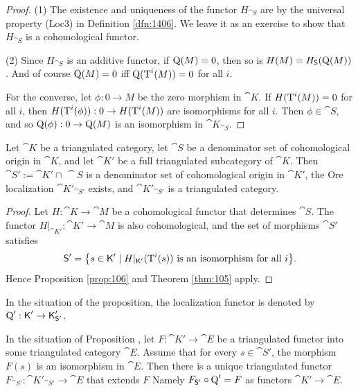 \begin{proof} \mbox{}

\smallskip \noindent
(1) The existence and uniqueness of the functor $H_{\cat{S}}$ are by the 
universal property (Loc3) in Definition \ref{dfn:1406}. 
We leave it as an exercise to show that $H_{\cat{S}}$ is a cohomological 
functor. 

\medskip \noindent 
(2) Since $H_{\cat{S}}$ is an additive functor, 
if $\operatorname{Q}(M) = 0$, then so is 
$H(M) = H_{\operatorname{\mathsf{S}}}(\operatorname{Q}(M))$. And of course $\operatorname{Q}(M) = 0$ iff
$\operatorname{Q}(\operatorname{T}^i(M)) = 0$ for all $i$. 

For the converse, let $\phi: 0 \to M$ be the zero morphism in $\cat{K}$. 
If $H(\operatorname{T}^i(M)) = 0$ for all $i$, then 
$H(\operatorname{T}^i(\phi)) : 0 \to H(\operatorname{T}^i(M))$
are isomorphisms for all $i$. Then $\phi \in \cat{S}$, and so 
$\operatorname{Q}(\phi) : 0 \to \operatorname{Q}(M)$
is an isomorphism in  $\cat{K}_{\cat{S}}$.
\end{proof}

\begin{prop} \label{prop:1480}
Let $\cat{K}$ be a triangulated category, let 
$\cat{S}$ be a denominator set of cohomological origin in $\cat{K}$, and let 
$\cat{K}'$ be a full triangulated subcategory of $\cat{K}$. 
Then $\cat{S}' := \cat{K}' \cap \, \cat{S}$ is a denominator set of 
cohomological origin in $\cat{K}'$, the Ore localization 
$\cat{K}'_{\cat{S}'}$ exists, and $\cat{K}'_{\cat{S}'}$ is a triangulated 
category. 
\end{prop}

\begin{proof}
Let $H :  \cat{K} \to \cat{M}$ be a cohomological functor that determines 
$\cat{S}$. The functor $H|_{\cat{K}'} : \cat{K}' \to \cat{M}$ is also 
cohomological, and the set of morphisms $\cat{S}'$ satisfies 
\[ \operatorname{\mathsf{S}}' = \bigl\{ s \in  \operatorname{\mathsf{K}}'
\mid  H|_{\operatorname{\mathsf{K}}'}(\operatorname{T}^i(s))  \textup{ is an isomorphism for all } i \bigr\}  
. \]
Hence Proposition \ref{prop:106} and Theorem \ref{thm:105} apply.
\end{proof}

In the situation of the proposition, the localization functor is denoted by
$\operatorname{Q}' : \operatorname{\mathsf{K}}' \to \operatorname{\mathsf{K}}'_{\operatorname{\mathsf{S}}'}$.

\begin{prop} \label{prop:1496}
In the situation of Proposition \tup{\ref{prop:1480}}, 
let $F : \cat{K}' \to \cat{E}$ be a triangulated functor into some 
triangulated category $\cat{E}$. Assume that for every 
$s \in \cat{S}'$, the morphism $F(s)$ is an isomorphism in $\cat{E}$. 
Then there is a unique triangulated functor 
$F_{\cat{S}'} : \cat{K}'_{\cat{S}'} \to \cat{E}$
that extends $F$\tup{;} Namely 
$F_{\operatorname{\mathsf{S}}'} \circ \operatorname{Q}' = F$ as functors $\cat{K}' \to \cat{E}$.
\end{prop}

